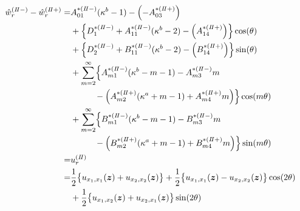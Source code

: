 \begin{align}
	\hat{w}_{r}^{(I\hspace{-.15em}I-)}-\hat{w}_{r}^{(I\hspace{-.15em}I+)} =
	&A_{01}^{*(I\hspace{-.15em}I-)}(\kappa^{b}-1)-\Bigl(-A_{03}^{*(I\hspace{-.15em}I+)}\Bigr)
	\nonumber
	\\
	&+\Bigl\{D_{1}^{*(I\hspace{-.15em}I-)}+A_{11}^{*(I\hspace{-.15em}I-)}(\kappa^{b}-2)
	-\Bigl(A_{14}^{*(I\hspace{-.15em}I+)}\Bigr)\Bigr\}\cos(\theta)
	\nonumber
	\\
	&+\Bigl\{D_{2}^{*(I\hspace{-.15em}I-)}+B_{11}^{*(I\hspace{-.15em}I-)}(\kappa^{b}-2)
	-\Bigl(B_{14}^{*(I\hspace{-.15em}I+)}\Bigr)\Bigr\}\sin(\theta)
	\nonumber
	\\
	&+\sum_{m=2}^{\infty}\Bigl\{A_{m1}^{*(I\hspace{-.15em}I-)}(\kappa^{b}-m-1)
	-A_{m3}^{*(I\hspace{-.15em}I-)}m
	\nonumber
	\\
	&\hspace{1.0cm}-\Bigl(A_{m2}^{*(I\hspace{-.15em}I+)}(\kappa^{a}+m-1)
	+A_{m4}^{*(I\hspace{-.15em}I+)}m\Bigr)\Bigr\}\cos(m\theta)
	\nonumber
	\\
	&+\sum_{m=2}^{\infty}\Bigl\{B_{m1}^{*(I\hspace{-.15em}I-)}(\kappa^{b}-m-1)
	-B_{m3}^{*(I\hspace{-.15em}I-)}m
	\nonumber
	\\
	&\hspace{1.0cm}-\Bigl(B_{m2}^{*(I\hspace{-.15em}I+)}(\kappa^{a}+m-1)
	+B_{m4}^{*(I\hspace{-.15em}I+)}m\Bigr)\Bigr\}\sin(m\theta)
	\nonumber
	\\
	=&u_{r}^{(I\hspace{-.15em}I)}
	\nonumber
	\\
	=&\frac{1}{2}\bigl\{u_{x_{1},x_{1}}(\bm{z})+u_{x_{2},x_{2}}(\bm{z})\bigr\}
	+\frac{1}{2}\bigl\{u_{x_{1},x_{1}}(\bm{z})-u_{x_{2},x_{2}}(\bm{z})\bigr\}\cos(2\theta)
	\nonumber
	\\
	&+\frac{1}{2}\bigl\{u_{x_{1},x_{2}}(\bm{z})+u_{x_{2},x_{1}}(\bm{z})\bigr\}\sin(2\theta)
	\label{eq:UR2eq}
\end{align}

